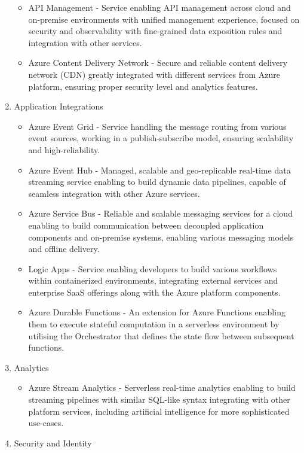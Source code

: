 \begin{enumerate}
   \begin{itemize}
       \item API Management - Service enabling API management across cloud and on-premise environments with unified management experience, focused on security and observability with fine-grained data exposition rules and integration with other services.
       \item Azure Content Delivery Network - Secure and reliable content delivery network (CDN) greatly integrated with different services from Azure platform, ensuring proper security level and analytics features.
   \end{itemize}
   \item Application Integrations
   \begin{itemize}
       \item Azure Event Grid - Service handling the message routing from various event sources, working in a publish-subscribe model, ensuring scalability and high-reliability.
       \item Azure Event Hub - Managed, scalable and geo-replicable real-time data streaming service enabling to build dynamic data pipelines, capable of seamless integration with other Azure services.
       \item Azure Service Bus - Reliable and scalable messaging services for a cloud enabling to build communication between decoupled application components and on-premise systems, enabling various messaging models and offline delivery.
       \item Logic Apps - Service enabling developers to build various workflows within containerized environments, integrating external services and enterprise SaaS offerings along with the Azure platform components.
       \item Azure Durable Functions - An extension for Azure Functions enabling them to execute stateful computation in a serverless environment by utilising the Orchestrator that defines the state flow between subsequent functions.
   \end{itemize}
   \item Analytics
   \begin{itemize}
       \item Azure Stream Analytics - Serverless real-time analytics enabling to build streaming pipelines with similar SQL-like syntax integrating with other platform services, including artificial intelligence for more sophisticated use-cases.
   \end{itemize}
   \item Security and Identity

\end{enumerate}
